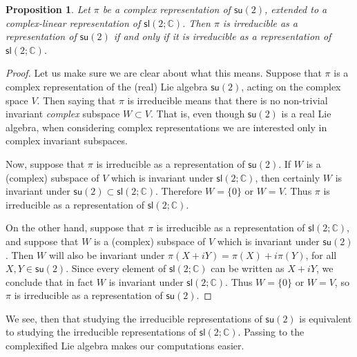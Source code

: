 \documentclass[12pt]{amsbook}
\theoremstyle{plain}
\newtheorem{proposition}[theorem]{Proposition}
\numberwithin{equation}{chapter}
\numberwithin{theorem}{chapter}
\begin{document}
\begin{proposition}
Let $\pi$ be a complex representation of $\mathsf{su}(2)$, extended to a
complex-linear representation of $\mathsf{sl}(2;\mathbb{C})$. Then $\pi$ is
irreducible as a representation of $\mathsf{su}(2)$ if and only if it is
irreducible as a representation of $\mathsf{sl}(2;\mathbb{C})$.
\end{proposition}

\begin{proof}
Let us make sure we are clear about what this means. Suppose that $\pi$ is a
complex representation of the (real) Lie algebra $\mathsf{su}(2)$, acting on
the complex space $V$. Then saying that $\pi$ is irreducible means that there
is no non-trivial invariant \textit{complex} subspace $W\subset V$. That is,
even though $\mathsf{su}(2)$ is a real Lie algebra, when considering complex
representations we are interested only in complex invariant subspaces.

Now, suppose that $\pi$ is irreducible as a representation of $\mathsf{su}%
(2)$. If $W$ is a (complex) subspace of $V$ which is invariant under
$\mathsf{sl}(2;\mathbb{C})$, then certainly $W$ is invariant under
$\mathsf{su}(2)\subset\mathsf{sl}(2;\mathbb{C})$. Therefore $W=\{0\}$ or
$W=V$. Thus $\pi$ is irreducible as a representation of $\mathsf{sl}%
(2;\mathbb{C})$.

On the other hand, suppose that $\pi$ is irreducible as a representation of
$\mathsf{sl}(2;\mathbb{C})$, and suppose that $W$ is a (complex) subspace of
$V$ which is invariant under $\mathsf{su}(2)$. Then $W$ will also be invariant
under $\pi(X+iY)=\pi(X)+i\pi(Y)$, for all $X,Y\in\mathsf{su}(2)$. Since every
element of $\mathsf{sl}(2;\mathbb{C})$ can be written as $X+iY$, we conclude
that in fact $W$ is invariant under $\mathsf{sl}(2;\mathbb{C})$. Thus
$W=\{0\}$ or $W=V$, so $\pi$ is irreducible as a representation of
$\mathsf{su}(2)$.
\end{proof}

We see, then that studying the irreducible representations of $\mathsf{su}(2)
$ is equivalent to studying the irreducible representations of $\mathsf{sl}%
(2;\mathbb{C})$. Passing to the complexified Lie algebra makes our
computations easier.
\end{document}
